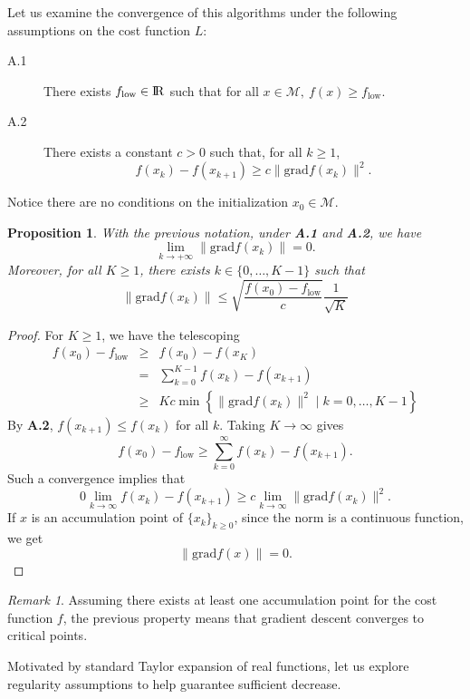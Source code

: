\documentclass[10pt,a4paper]{book}
\theoremstyle{definition}
\theoremstyle{plain}
\newtheorem{prop}{Proposition}[section]
\theoremstyle{remark}
\newtheorem{rmk}{Remark}[section]
\newcommand{\grad}{\textrm{grad}}
\newcommand \M {\mathcal{M}}
\def\R{{\rm I\kern-0.16em R}}
\begin{document}
Let us examine the convergence of this algorithms under the following assumptions on the cost function $L$:
\begin{description}
\item[A.1] There exists $f_{\text{low}}\in \R$ such that for all $x\in \M,~f(x)\ge f_{\text{low}}$. 
\item[A.2] There exists a constant $c>0$ such that, for all $k\ge 1$,
$$f(x_k)-f(x_{k+1})\ge c\|\grad f(x_k)\|^2.$$
\end{description}
Notice there are no conditions on the initialization $x_0\in \M$.
\begin{prop}
With the previous notation, under \textbf{A.1} and \textbf{A.2}, we have
$$\lim_{k\to +\infty}\|\grad f(x_k)\|=0.$$
Moreover, for all $K\ge 1$, there exists $k\in \{0,\dots, K-1\}$ such that
$$\|\grad f(x_k)\|\leq \sqrt{\frac{f(x_0)-f_{\text{low}}}{c}}\frac{1}{\sqrt{K}}$$
\end{prop}
\begin{proof}
For $K\ge 1$, we have the telescoping
\begin{eqnarray*}
f(x_0)-f_{\text{low}}&\ge& f(x_0)-f(x_K)\\
&=&\sum_{k=0}^{K-1}f(x_k)-f(x_{k+1})\\
&\geq &Kc\min\left\{\|\grad f(x_k)\|^2 \mid k=0,\dots, K-1\right\}
\end{eqnarray*}
By \textbf{A.2}, $f(x_{k+1})\leq f(x_k)$ for all $k$. Taking $K\to \infty$ gives
$$f(x_0)-f_{\text{low}}\ge \sum_{k=0}^{\infty}f(x_k)-f(x_{k+1}).$$
Such a convergence implies that 
$$0\lim_{k\to\infty}f(x_k)-f(x_{k+1})\ge c\lim_{k\to \infty}\|\grad f(x_k)\|^2.$$
If $x$ is an accumulation point of $\{x_k\}_{k\ge 0}$, since the norm is a continuous function, we get
$$\|\grad f(x)\|=0.$$
\end{proof}
\begin{rmk}
Assuming there exists at least one accumulation point for the cost function $f$, the previous property means that gradient descent converges to critical points.
\end{rmk}
Motivated by standard Taylor expansion of real functions, let us explore regularity assumptions to help guarantee sufficient decrease.
\end{document}
